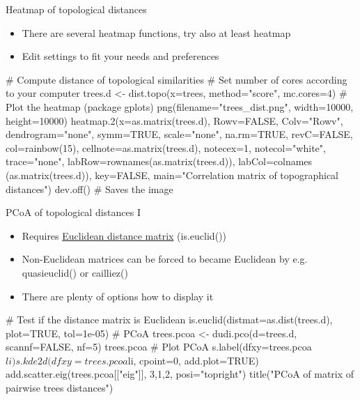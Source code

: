 \documentclass[compress,  xelatex, 11pt, xcolor=x11names, aspectratio=169,
	hyperref={
		bookmarks=true,
		unicode=true,
		colorlinks=true,
		pdftitle={HybSeq course},
		plainpages=false,
		pdfauthor={Vojtech Zeisek},
		pdfsubject={Practical processing of HybSeq target enrichment sequencing data on computing grids like MetaCentrum},
		pdfcreator={XeLaTeX},
		pdfkeywords={BASH, command line, GNU, HybSeq, Linux, MetaCentrum, sequencing shell, target enrichment},
		linkcolor=Turquoise4, %
		anchorcolor=DodgerBlue4, %
		citecolor=DodgerBlue4, %
		filecolor=DodgerBlue4, %
		menucolor=Tan4, %
		urlcolor=DarkOliveGreen4 %
		},
	url={hyphens, lowtilde} %
	]{beamer}
\renewcommand{\texttt}[1]{\colorbox{Cornsilk2}{{\ttfamily #1}}}
\begin{document}
\begin{frame}[fragile]{Heatmap of topological distances}
	\begin{itemize}
		\item There are several heatmap functions, try also at least \texttt{heatmap}
		\item Edit settings to fit your needs and preferences
	\end{itemize}
	\begin{spluscode}
    # Compute distance of topological similarities
    # Set number of cores according to your computer
    trees.d <- dist.topo(x=trees, method="score", mc.cores=4)
    # Plot the heatmap (package gplots)
    png(filename="trees_dist.png", width=10000, height=10000)
      heatmap.2(x=as.matrix(trees.d), Rowv=FALSE, Colv="Rowv",
        dendrogram="none", symm=TRUE, scale="none", na.rm=TRUE,
        revC=FALSE, col=rainbow(15), cellnote=as.matrix(trees.d),
        notecex=1, notecol="white", trace="none",
        labRow=rownames(as.matrix(trees.d)), labCol=colnames
        (as.matrix(trees.d)), key=FALSE, main="Correlation
        matrix of topographical distances")
      dev.off() # Saves the image
	\end{spluscode}
\end{frame}

\begin{frame}[fragile]{PCoA of topological distances I}
	\begin{itemize}
		\item Requires \href{https://en.wikipedia.org/wiki/Euclidean_distance_matrix}{Euclidean distance matrix} (\texttt{is.euclid()})
		\item Non-Euclidean matrices can be forced to became Euclidean by e.g. \texttt{quasieuclid()} or \texttt{cailliez()}
		\item There are plenty of options how to display it
	\end{itemize}
	\begin{spluscode}
    # Test if the distance matrix is Euclidean
    is.euclid(distmat=as.dist(trees.d), plot=TRUE, tol=1e-05)
    # PCoA
    trees.pcoa <- dudi.pco(d=trees.d, scannf=FALSE, nf=5)
    trees.pcoa
    # Plot PCoA
    s.label(dfxy=trees.pcoa$li)
    s.kde2d(dfxy=trees.pcoa$li, cpoint=0, add.plot=TRUE)
    add.scatter.eig(trees.pcoa[["eig"]], 3,1,2, posi="topright")
    title("PCoA of matrix of pairwise trees distances")
	\end{spluscode}
\end{frame}
\end{document}
